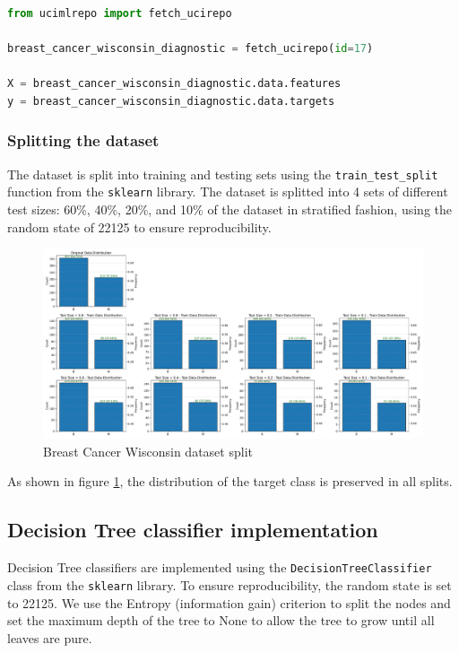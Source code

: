 \lstset{style=code}
\begin{lstlisting}[language=Python]
from ucimlrepo import fetch_ucirepo 

breast_cancer_wisconsin_diagnostic = fetch_ucirepo(id=17) 
    
X = breast_cancer_wisconsin_diagnostic.data.features 
y = breast_cancer_wisconsin_diagnostic.data.targets 
\end{lstlisting}

\subsubsection{Splitting the dataset}

The dataset is split into training and testing sets using the \texttt{train\_test\_split} function from the \texttt{sklearn} library. 
The dataset is splitted into 4 sets of different test sizes: 60\%, 40\%, 20\%, and 10\% of the dataset in stratified fashion, using the random state of 22125 to ensure reproducibility.

\begin{figure}[H]
    \centering
    \includegraphics[width=\textwidth]{figures/breast_cancer_wisconsin_split.pdf}
    \caption{Breast Cancer Wisconsin dataset split}
    \label{fig:breast_cancer_wisconsin_split}
\end{figure}

As shown in figure \ref{fig:breast_cancer_wisconsin_split}, the distribution of the target class is preserved in all splits.

\subsection{Decision Tree classifier implementation}

Decision Tree classifiers are implemented using the \texttt{DecisionTreeClassifier} class from the \texttt{sklearn} library. 
To ensure reproducibility, the random state is set to 22125. 
We use the Entropy (information gain) criterion to split the nodes and set the maximum depth of the tree to None to allow the tree to grow until all leaves are pure.

